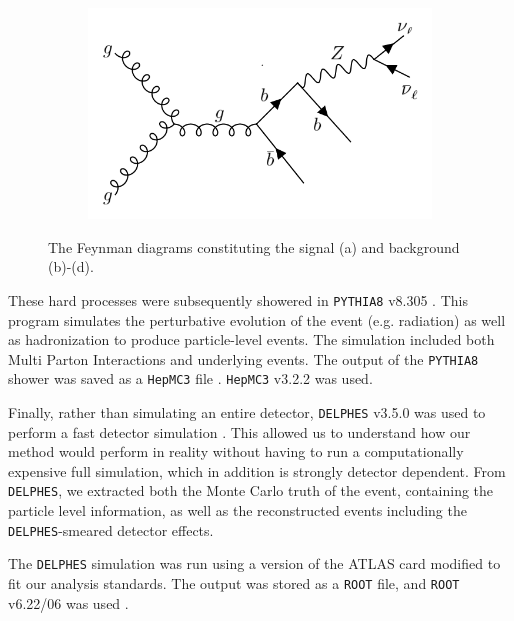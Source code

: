 \documentclass[10pt,a4paper]{book}
\def\code#1{\texttt{#1}}
\begin{document}
\begin{figure}
\begin{subfigure}{.5\textwidth}
\caption{}
\end{subfigure}
\begin{subfigure}{.5\textwidth}
\centering
\includegraphics[width=\textwidth]{ch4_images/gbb3}
\caption{}
\end{subfigure}
\caption{The Feynman diagrams constituting the signal (a) and background (b)-(d).}
\label{zhbb + gbb feynman diagrams}
\end{figure}

These hard processes were subsequently showered in \code{PYTHIA8} v8.305 \cite{Sjostrand:2014zea}. This program simulates the perturbative evolution of the event (e.g. radiation) as well as hadronization to produce particle-level events. The simulation included both Multi Parton Interactions and underlying events. The output of the \code{PYTHIA8} shower was saved as a \code{HepMC3} file \cite{BUCKLEY2021107310, Dobbs:2001ck}. \code{HepMC3} v3.2.2 was used.

Finally, rather than simulating an entire detector, \code{DELPHES} v3.5.0 was used to perform a fast detector simulation \cite{Ovyn:2009tx, deFavereau:2013fsa}. This allowed us to understand how our method would perform in reality without having to run a computationally expensive full simulation, which in addition is strongly detector dependent. From \code{DELPHES}, we extracted both the Monte Carlo truth of the event, containing the particle level information, as well as the reconstructed events including the \code{DELPHES}-smeared detector effects. 

The \code{DELPHES} simulation was run using a version of the ATLAS card modified to fit our analysis standards. The output was stored as a \code{ROOT} file, and \code{ROOT} v6.22/06 was used \cite{fons_rademakers_2020_3895852}. 
\end{document}
